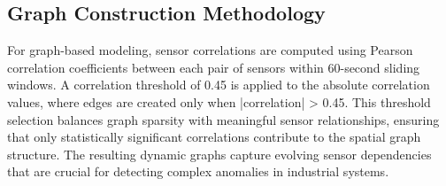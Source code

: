 \subsection{Graph Construction Methodology}

For graph-based modeling, sensor correlations are computed using Pearson correlation coefficients between each pair of sensors within 60-second sliding windows. A correlation threshold of 0.45 is applied to the absolute correlation values, where edges are created only when |correlation| > 0.45. This threshold selection balances graph sparsity with meaningful sensor relationships, ensuring that only statistically significant correlations contribute to the spatial graph structure. The resulting dynamic graphs capture evolving sensor dependencies that are crucial for detecting complex anomalies in industrial systems. 